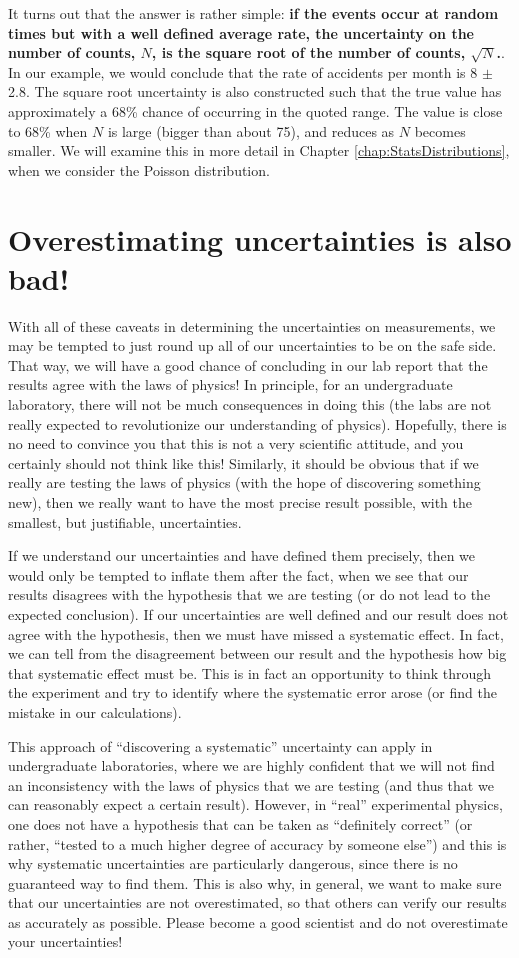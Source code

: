 It turns out that the answer is rather simple: \textbf{if the events occur at random times but with a well defined average rate, the uncertainty on the number of counts, $N$, is the square root of the number of counts, $\sqrt{N}$.}. In our example, we would conclude that the rate of accidents per month is 8 $\pm$ 2.8. The square root uncertainty is also constructed such that the true value has approximately a 68\% chance of occurring in the quoted range. The value is close to 68\% when $N$ is large (bigger than about 75), and reduces as $N$ becomes smaller. We will examine this in more detail in Chapter \ref{chap:StatsDistributions}, when we consider the Poisson distribution.

\section{Overestimating uncertainties is also bad!}
With all of these caveats in determining the uncertainties on measurements, we may be tempted to just round up all of our uncertainties to be on the safe side. That way, we will have a good chance of concluding in our lab report that the results agree with the laws of physics! In principle, for an undergraduate laboratory, there will not be much consequences in doing this (the labs are not really expected to revolutionize our understanding of physics). Hopefully, there is no need to convince you that this is not a very scientific attitude, and you certainly should not think like this! Similarly, it should be obvious that if we really are testing the laws of physics (with the hope of discovering something new), then we really want to have the most precise result possible, with the smallest, but justifiable, uncertainties.

If we understand our uncertainties and have defined them precisely, then we would only be tempted to inflate them after the fact, when we see that our results disagrees with the hypothesis that we are testing (or do not lead to the expected conclusion). If our uncertainties are well defined and our result does not agree with the hypothesis, then we must have missed a systematic effect. In fact, we can tell from the disagreement between our result and the hypothesis how big that systematic effect must be. This is in fact an opportunity to think through the experiment and try to identify where the systematic error arose (or find the mistake in our calculations).

This approach of ``discovering a systematic'' uncertainty can apply in undergraduate laboratories, where we are highly confident that we will not find an inconsistency with the laws of physics that we are testing (and thus that we can reasonably expect a certain result). However, in ``real'' experimental physics, one does not have a hypothesis that can be taken as ``definitely correct'' (or rather, ``tested to a much higher degree of accuracy by someone else'') and this is why systematic uncertainties are particularly dangerous, since there is no guaranteed way to find them. This is also why, in general, we want to make sure that our uncertainties are not overestimated, so that others can verify our results as accurately as possible. Please become a good scientist and do not overestimate your uncertainties!


